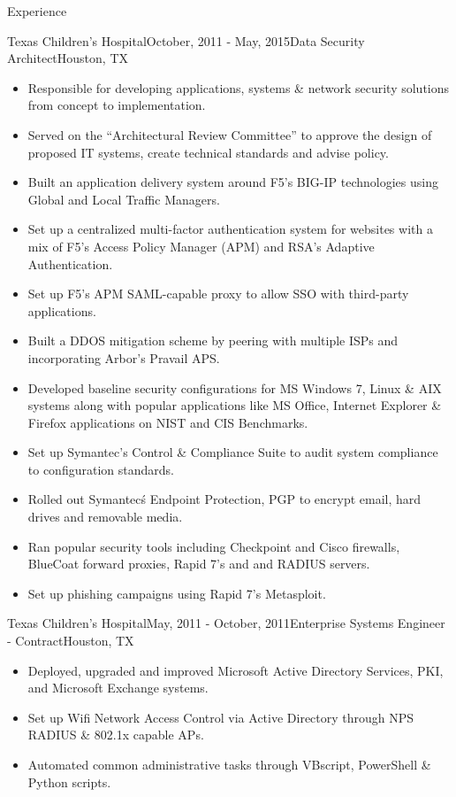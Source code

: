 \documentclass{resume} %
\begin{document}
\begin{rSection}{Experience}
\begin{rSubsection}{Texas Children's Hospital}{October, 2011 - May, 2015}{Data Security Architect}{Houston, TX}
\begin{itemize}
        \item Responsible for developing applications, systems \& network security solutions from concept to implementation.
        \item Served on the ``Architectural Review Committee'' to approve the design of proposed IT systems, create technical standards and advise policy.
        \item Built an application delivery system around F5's BIG-IP technologies using Global and Local Traffic Managers.
        \item Set up a centralized multi-factor authentication system for websites with a mix of F5's Access Policy Manager (APM) and RSA's Adaptive Authentication.
        \item Set up F5's APM SAML-capable proxy to allow SSO with third-party applications.
        \item Built a DDOS mitigation scheme by peering with multiple ISPs and incorporating Arbor's Pravail APS.
        \item Developed baseline security configurations for MS Windows 7, Linux \& AIX systems along with popular applications like MS Office, Internet Explorer \& Firefox applications on NIST and CIS Benchmarks.
        \item Set up Symantec's Control \& Compliance Suite to audit system compliance to configuration standards.
        \item Rolled out Symantec\'s Endpoint Protection, PGP to encrypt email, hard drives and removable media.
        \item Ran popular security tools including Checkpoint and Cisco firewalls, BlueCoat forward proxies, Rapid 7's and and RADIUS servers.
        \item Set up phishing campaigns using Rapid 7's Metasploit.
  \end{itemize}
\end{rSubsection}

\begin{rSubsection}{Texas Children's Hospital}{May, 2011 - October, 2011}{Enterprise Systems Engineer - Contract}{Houston, TX}
  \begin{itemize}
        \item Deployed, upgraded and improved Microsoft Active Directory Services, PKI, and Microsoft Exchange systems.
        \item Set up Wifi Network Access Control via Active Directory through NPS RADIUS \& 802.1x capable APs.
        \item Automated common administrative tasks through VBscript, PowerShell & Python scripts.
  \end{itemize}
\end{rSubsection}


\end{rSection}
\end{document}
